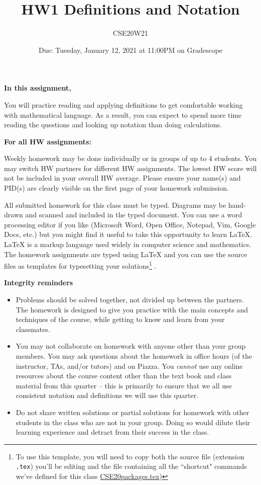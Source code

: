 \documentclass[12pt, oneside]{article}
\title{HW1 Definitions and Notation}
\author{CSE20W21}
\date{Due: Tuesday, January 12, 2021 at 11:00PM on Gradescope}
\begin{document}
\maketitle

{\bf In this assignment,}

You will practice reading and
applying definitions to get comfortable working with mathematical language. As
a result, you can expect to spend more time reading the questions and looking
up notation than doing calculations.


{\bf For all HW assignments:}

Weekly homework may be done individually or in groups of up to 4 students. You may switch HW partners for different HW assignments. The lowest HW score will not be included in your overall HW average. Please ensure your name(s) and PID(s) are clearly visible on the first page of your homework submission.

All submitted homework for this class must be typed. Diagrams may be hand-drawn and scanned and included in the typed document. You can use a word processing editor if you like (Microsoft Word, Open Office, Notepad, Vim, Google Docs, etc.) but you might find it useful to take this opportunity to learn LaTeX. LaTeX is a markup language used widely in computer science and mathematics. The homework assignments are typed using LaTeX and you can use the source files as templates for typesetting your solutions\footnote{To use this template, you will need to copy both the source file (extension \texttt{.tex})  you'll be editing
and the file containing all the ``shortcut" commands we've defined for this class \href{https://drive.google.com/file/d/1-iFMqMK-_PvjW1czijoV8kuOP02alWw6/view?usp=sharing}{CSE20packages.tex})} .


{\bf Integrity reminders}
\begin{itemize}
\item Problems should be solved together, not divided up between the partners. The homework is
designed to give you practice with the main concepts and techniques of the course, while getting to know and learn from your classmates.
\item You may not collaborate on homework with anyone other than your group members.
You may ask questions about the homework in office hours (of the instructor, TAs, and/or tutors) and 
on Piazza.  You \emph{cannot} use any online resources about the course content other than the text
book and class material from this quarter -- this is primarily to ensure that we all use consistent notation and
definitions we will use this quarter.
\item Do not share written solutions or partial solutions for homework with other students in the class who are not in your group. Doing so would dilute their learning experience and detract from their success in the class.
\end{itemize}
\end{document}
